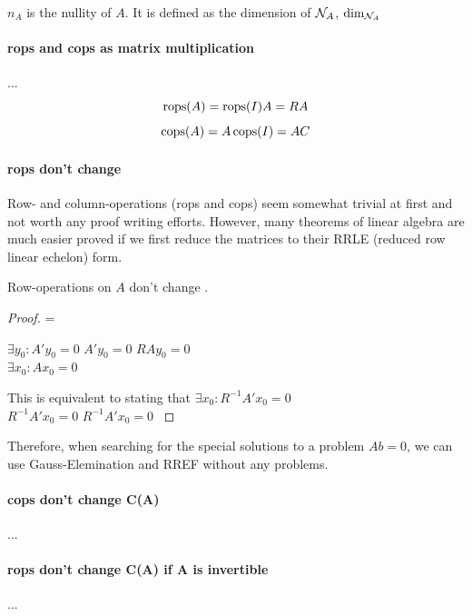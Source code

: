 \begin{definition}[Nullity]
    $n_A$ is the nullity of $A$. It is defined as the dimension of $\mathcal{N}_{A}$, $\text{dim}_{\mathcal{N}_{A}}$
\end{definition}


\paragraph{rops and cops as matrix multiplication} ...
$$ \operatorname{rops}(A) = \operatorname{rops}(I) A = R A$$
$$ \operatorname{cops}(A) = A \operatorname{cops}(I) = A C$$

\paragraph{rops don't change }
Row- and column-operations (rops and cops) seem somewhat trivial at first and not worth any proof writing efforts. However, many theorems of linear algebra are much easier proved if we first reduce the matrices to their RRLE (reduced row linear echelon) form.

\begin{theorem}
  Row-operations on $A$ don't change . 
\end{theorem}

\begin{proof}
     { = } {
         {$\exists y_0: A'y_0 = 0$} {
             {$A'y_0 = 0$} {
                $RAy_0 = 0$
            }
        } \\
         {$\exists x_0: Ax_0 = 0$} {
            This is equivalent to stating that $\exists x_0: R^{-1} A' x_0 = 0$ \\
             {$R^{-1} A' x_0 = 0$} {
                $R^{-1} A' x_0 = 0$
            }
            
        }
    } 
\end{proof}

Therefore, when searching for the special solutions to a problem $Ab = 0$, we can use Gauss-Elemination and RREF without any problems.

\paragraph{cops don't change C(A)} ...

\paragraph{rops don't change C(A) if A is invertible }...

